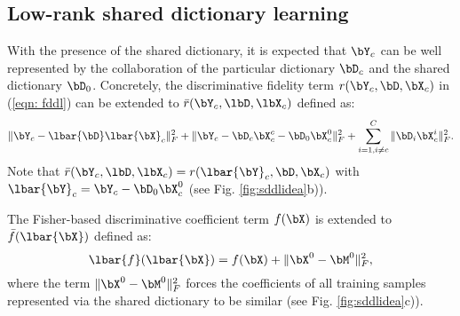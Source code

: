 \documentclass[letterpaper]{article}
\begin{document}

\subsection{Low-rank shared dictionary learning } %
\label{sub:low_rand_shared_dictionary_learning_}
With the presence of the shared dictionary, it is expected that $\bY_c$ can be well represented by the collaboration of the particular dictionary $\bD_c$ and the shared dictionary $\bD_0$. Concretely, the discriminative fidelity term $r(\bY_c, \bD, \bX_c)$ in (\ref{eqn: fddl}) can be extended to $\bar{r}(\bY_c, \lbD, \lbX_c)$ defined as:
\vspace{-0.05in}
\begin{equation*}
    \|\bY_c - \lbar{\bD}\lbar{\bX}_c\|_F^2 + \|\bY_c - \bD_c\bX_c^c - \bD_0\bX^0_c\|_F^2 + \sum_{i = 1, i\neq c}^C \|\bD_i\bX^i_c\|_F^2.
\end{equation*}
Note that $\bar{r}(\bY_c, \lbD, \lbX_c) = r(\lbar{\bY}_c, \bD, \bX_c)$ with $\lbar{\bY}_c = \bY_c - \bD_0\bX^0_c$ (see Fig. \ref{fig:sddlidea}b)).
\par
The Fisher-based discriminative coefficient term $f(\bX)$ is extended to $\bar{f}(\lbar{\bX})$ defined as:
\vspace{-0.05in}
\begin{equation}
\label{eqn:deffbar}
    \lbar{f}(\lbar{\bX}) = f(\bX) + \|\bX^0 -\bM^0\|_F^2,
\end{equation}
where the term $\|\bX^0 -\bM^0\|_F^2$ forces the coefficients of all training samples represented via the shared dictionary to be similar (see Fig. \ref{fig:sddlidea}c)).
\end{document}
